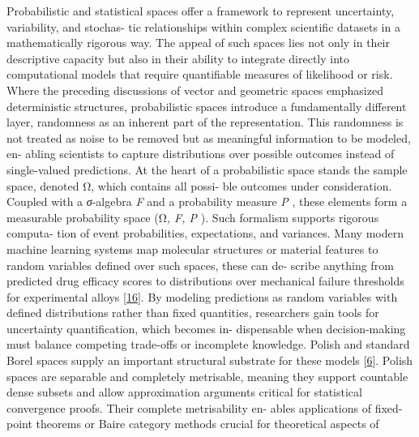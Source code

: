 \documentclass[
]{article}
\begin{document}
Probabilistic and statistical spaces offer a framework to represent
uncertainty, variability, and stochas- tic relationships within complex
scientific datasets in a mathematically rigorous way. The appeal of such
spaces lies not only in their descriptive capacity but also in their
ability to integrate directly into computational models that require
quantifiable measures of likelihood or risk. Where the preceding
discussions of vector and geometric spaces emphasized deterministic
structures, probabilistic spaces introduce a fundamentally different
layer, randomness as an inherent part of the representation. This
randomness is not treated as noise to be removed but as meaningful
information to be modeled, en- abling scientists to capture
distributions over possible outcomes instead of single-valued
predictions. At the heart of a probabilistic space stands the sample
space, denoted Ω, which contains all possi- ble outcomes under
consideration. Coupled with a \emph{σ}-algebra \emph{F} and a
probability measure \emph{P} , these elements form a measurable
probability space (Ω\emph{, F, P} ). Such formalism supports rigorous
computa- tion of event probabilities, expectations, and variances. Many
modern machine learning systems map molecular structures or material
features to random variables defined over such spaces, these can de-
scribe anything from predicted drug efficacy scores to distributions
over mechanical failure thresholds for experimental alloys
{[}\protect\hyperlink{_bookmark56}{16}{]}. By modeling predictions as
random variables with defined distributions rather than fixed
quantities, researchers gain tools for uncertainty quantification, which
becomes in- dispensable when decision-making must balance competing
trade-offs or incomplete knowledge. Polish and standard Borel spaces
supply an important structural substrate for these models
{[}\protect\hyperlink{_bookmark46}{6}{]}. Polish spaces are separable
and completely metrisable, meaning they support countable dense subsets
and allow approximation arguments critical for statistical convergence
proofs. Their complete metrisability en- ables applications of
fixed-point theorems or Baire category methods crucial for theoretical
aspects of
\end{document}

